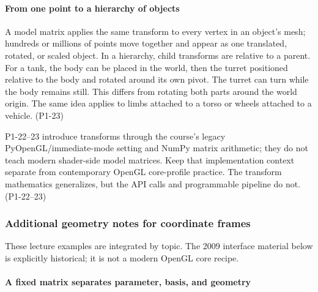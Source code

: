 \paragraph{From one point to a hierarchy of objects}\label{03-visual-computing-i-ch001-from-one-point-to-a-hierarchy-of-objects}

\hypertarget{03-visual-computing-i-ch001-from-one-point-to-a-hierarchy-of-objects}{}

A model matrix applies the same transform to every vertex in an object's mesh; hundreds or millions of points move together and appear as one translated, rotated, or scaled object. In a hierarchy, child transforms are relative to a parent. For a tank, the body can be placed in the world, then the turret positioned relative to the body and rotated around its own pivot. The turret can turn while the body remains still. This differs from rotating both parts around the world origin. The same idea applies to limbs attached to a torso or wheels attached to a vehicle. (P1-23)

P1-22--23 introduce transforms through the course's legacy PyOpenGL/immediate-mode setting and NumPy matrix arithmetic; they do not teach modern shader-side model matrices. Keep that implementation context separate from contemporary OpenGL core-profile practice. The transform mathematics generalizes, but the API calls and programmable pipeline do not. (P1-22--23)

\subsubsection{Additional geometry notes for coordinate frames}\label{03-visual-computing-i-ch001-additional-geometry-notes-for-coordinate-frames}

\hypertarget{03-visual-computing-i-ch001-additional-geometry-notes-for-coordinate-frames}{}

These lecture examples are integrated by topic. The 2009 interface material below is explicitly historical; it is not a modern OpenGL core recipe.

\paragraph{A fixed matrix separates parameter, basis, and geometry}\label{03-visual-computing-i-ch001-a-fixed-matrix-separates-parameter-basis-and-geometry}

\hypertarget{03-visual-computing-i-ch001-a-fixed-matrix-separates-parameter-basis-and-geometry}{}

